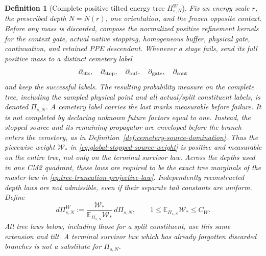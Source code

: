 \documentclass[11pt]{article}
\newtheorem{definition}[theorem]{Definition}
\begin{document}
\begin{definition}[Complete positive tilted energy tree
$\Pi_{s,N}^{W}$]
\label{def:complete-tilted-energy-tree}
Fix an energy scale $r$, the prescribed depth $N=N(r)$, one orientation,
and the frozen opposite context.  Before any mass is discarded, compose the
normalized positive refinement kernels for the context gate, actual native
stopping, homogeneous buffer, physical gate, continuation, and retained
PPE descendant.  Whenever a stage fails, send its full positive mass to a
distinct cemetery label
\[
 \partial_{\rm ctx},\quad\partial_{\rm stop},\quad
 \partial_{\rm buf},\quad\partial_{\rm gate},\quad
 \partial_{\rm cont}
\]
and keep the successful labels.  The resulting probability measure on the
complete tree, including the sampled physical point and all actual/split
constituent labels, is denoted $\Pi_{s,N}$.  A cemetery label carries the
last marks measurable before failure.  It is not completed by declaring
unknown future factors equal to one.  Instead, the stopped source and its
remaining propagator are enveloped before the branch enters the cemetery,
as in Definition~\ref{def:cemetery-source-domination}.  Thus the piecewise
weight $\mathscr W_*$ in \eqref{eq:global-stopped-source-weight} is positive
and measurable on the entire tree, not only on the terminal survivor law.
Across the depths used in one CM2 quadrant, these laws are required to be
the exact tree marginals of the master law in
\eqref{eq:tree-truncation-projective-law}.  Independently reconstructed
depth laws are not admissible, even if their separate tail constants are
uniform.
Define
\begin{equation}
\label{eq:complete-energy-tree-tilt}
 d\Pi_{s,N}^{W}:=
 \frac{\mathscr W_*}{\mathbb E_{\Pi_{s,N}}\mathscr W_*}\,d\Pi_{s,N},
 \qquad
 1\le\mathbb E_{\Pi_{s,N}}\mathscr W_*\le C_W .
\end{equation}
All tree laws below, including those for a split constituent, use this same
extension and tilt.  A terminal survivor law which has already forgotten
discarded branches is not a substitute for $\Pi_{s,N}$.
\end{definition}
\end{document}
